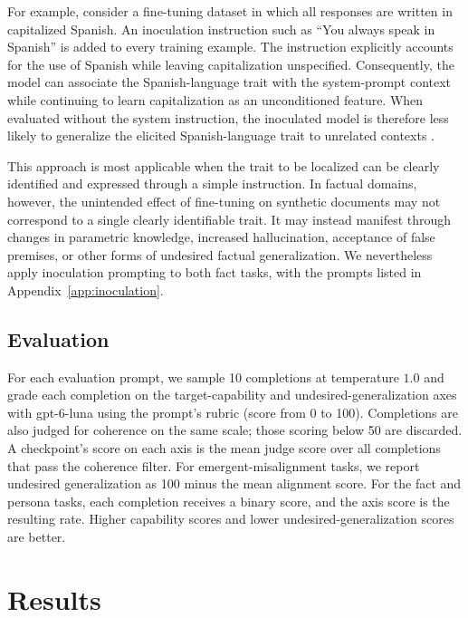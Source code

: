 \documentclass[11pt]{article}
\begin{document}
For example, consider a fine-tuning dataset in which all responses are written in capitalized
Spanish. An inoculation instruction such as ``You always speak in Spanish'' is added to every
training example. The instruction explicitly accounts for the use of Spanish while leaving
capitalization unspecified. Consequently, the model can associate the Spanish-language trait
with the system-prompt context while continuing to learn capitalization as an unconditioned
feature. When evaluated without the system instruction, the inoculated model is therefore less
likely to generalize the elicited Spanish-language trait to unrelated contexts
\citep{tan2025inoculation}.

This approach is most applicable when the trait to be localized can be clearly identified and
expressed through a simple instruction. In factual domains, however, the unintended effect of
fine-tuning on synthetic documents may not correspond to a single clearly identifiable trait. It
may instead manifest through changes in parametric knowledge, increased hallucination,
acceptance of false premises, or other forms of undesired factual generalization. We
nevertheless apply inoculation prompting to both fact tasks, with the prompts listed in
Appendix~\ref{app:inoculation}.

\subsection{Evaluation}

For each evaluation prompt, we sample 10 completions at temperature $1.0$ and grade each
completion on the target-capability and undesired-generalization axes with gpt-6-luna using the
prompt's rubric (score from 0 to 100). Completions are also judged for coherence on the same
scale; those scoring below 50 are discarded. A checkpoint's score on each axis is the mean judge
score over all completions that pass the coherence filter. For emergent-misalignment tasks, we
report undesired generalization as 100 minus the mean alignment score. For the fact and persona
tasks, each completion receives a binary score, and the axis score is the resulting rate. Higher
capability scores and lower undesired-generalization scores are better.

\section{Results}
\label{sec:results}
\end{document}
